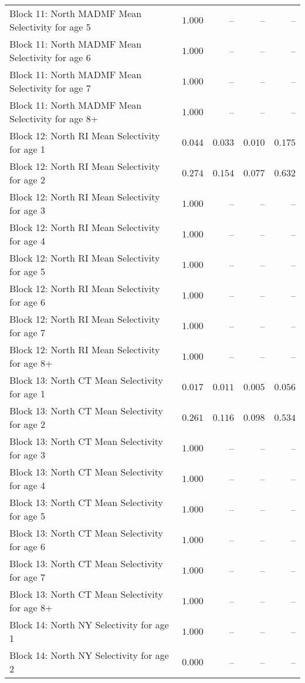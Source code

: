 \documentclass[
]{article}
\begin{document}
\begin{landscape}
\begin{longtable}[t]{lrrrr}
Block 11: North MADMF Mean Selectivity for age 5 & $1.000$ & -- & -- & --\\
Block 11: North MADMF Mean Selectivity for age 6 & $1.000$ & -- & -- & --\\
Block 11: North MADMF Mean Selectivity for age 7 & $1.000$ & -- & -- & --\\
\addlinespace
Block 11: North MADMF Mean Selectivity for age 8+ & $1.000$ & -- & -- & --\\
Block 12: North RI Mean Selectivity for age 1 & $0.044$ & $0.033$ & $0.010$ & $0.175$\\
Block 12: North RI Mean Selectivity for age 2 & $0.274$ & $0.154$ & $0.077$ & $0.632$\\
Block 12: North RI Mean Selectivity for age 3 & $1.000$ & -- & -- & --\\
Block 12: North RI Mean Selectivity for age 4 & $1.000$ & -- & -- & --\\
\addlinespace
Block 12: North RI Mean Selectivity for age 5 & $1.000$ & -- & -- & --\\
Block 12: North RI Mean Selectivity for age 6 & $1.000$ & -- & -- & --\\
Block 12: North RI Mean Selectivity for age 7 & $1.000$ & -- & -- & --\\
Block 12: North RI Mean Selectivity for age 8+ & $1.000$ & -- & -- & --\\
Block 13: North CT Mean Selectivity for age 1 & $0.017$ & $0.011$ & $0.005$ & $0.056$\\
\addlinespace
Block 13: North CT Mean Selectivity for age 2 & $0.261$ & $0.116$ & $0.098$ & $0.534$\\
Block 13: North CT Mean Selectivity for age 3 & $1.000$ & -- & -- & --\\
Block 13: North CT Mean Selectivity for age 4 & $1.000$ & -- & -- & --\\
Block 13: North CT Mean Selectivity for age 5 & $1.000$ & -- & -- & --\\
Block 13: North CT Mean Selectivity for age 6 & $1.000$ & -- & -- & --\\
\addlinespace
Block 13: North CT Mean Selectivity for age 7 & $1.000$ & -- & -- & --\\
Block 13: North CT Mean Selectivity for age 8+ & $1.000$ & -- & -- & --\\
Block 14: North NY Selectivity for age 1 & $1.000$ & -- & -- & --\\
Block 14: North NY Selectivity for age 2 & $0.000$ & -- & -- & --\\

\end{longtable}
\end{landscape}
\end{document}

